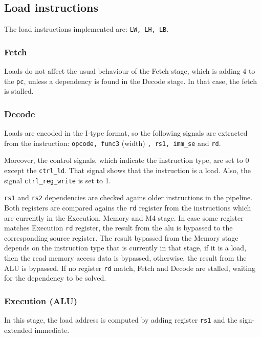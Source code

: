 \subsection{Load instructions}
The load instructions implemented are: \texttt{LW, LH, LB}.

\subsubsection{Fetch}
Loads do not affect the usual behaviour of the Fetch stage, which is adding 4 to the \texttt{pc}, unless a dependency is found in the Decode stage.
In that case, the fetch is stalled.

\subsubsection{Decode} \label{load_decode}
Loads are encoded in the I-type format, so the following signals are extracted from the instruction: \texttt{opcode, func3} (width) \texttt{, rs1, imm\_se} and \texttt{rd}.

Moreover, the control signals, which indicate the instruction type, are set to 0 except the \texttt{ctrl\_ld}. That signal shows that the instruction is a load.
Also, the signal \texttt{ctrl\_reg\_write} is set to 1.

\texttt{rs1} and \texttt{rs2} dependencies are checked agains older instructions in the pipeline. 
Both registers are compared agains the \texttt{rd} register from the instructions which are currently in the Execution, Memory and M4 stage.
In case some register matches Execution \texttt{rd} register, the result from the alu is bypassed to the corresponding source register.
The result bypassed from the Memory stage depends on the instruction type that is currently in that stage, if it is a load, then the read memory access data is bypassed, otherwise, the result from the ALU is bypassed.
If no register \texttt{rd} match, Fetch and Decode are stalled, waiting for the dependency to be solved.

\subsubsection{Execution (ALU)}
In this stage, the load address is computed by adding register \texttt{rs1} and the sign-extended immediate.

